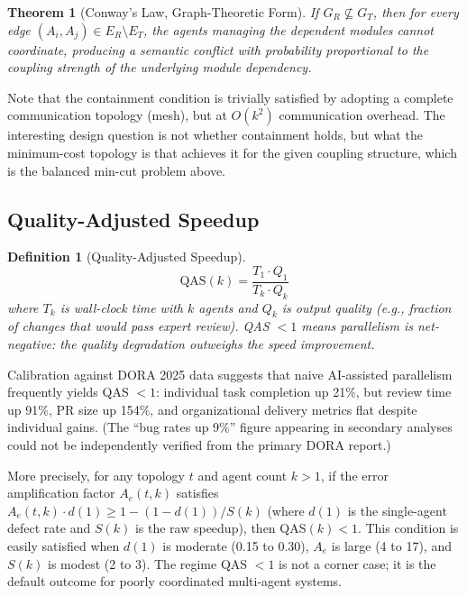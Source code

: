\documentclass[11pt, a4paper, logo, copyright]{googledeepmind}
\newtheorem{definition}{Definition}[section]
\newtheorem{theorem}{Theorem}[section]
\begin{document}
\begin{theorem}[Conway's Law, Graph-Theoretic Form]
\label{thm:conway}
If $G_R \not\subseteq G_T$, then for every edge $(A_i, A_j) \in E_R \setminus E_T$, the agents managing the dependent modules cannot coordinate, producing a semantic conflict with probability proportional to the coupling strength of the underlying module dependency.
\end{theorem}

Note that the containment condition is trivially satisfied by adopting a complete communication topology (mesh), but at $O(k^2)$ communication overhead. The interesting design question is not whether containment holds, but what the minimum-cost topology is that achieves it for the given coupling structure, which is the balanced min-cut problem above.

\subsection{Quality-Adjusted Speedup}

\begin{definition}[Quality-Adjusted Speedup]
\label{def:qas}
\begin{equation}
    \text{QAS}(k) = \frac{T_1 \cdot Q_1}{T_k \cdot Q_k}
\end{equation}
where $T_k$ is wall-clock time with $k$ agents and $Q_k$ is output quality (e.g., fraction of changes that would pass expert review). QAS $< 1$ means parallelism is net-negative: the quality degradation outweighs the speed improvement.
\end{definition}

Calibration against DORA 2025 data suggests that naive AI-assisted parallelism frequently yields QAS $< 1$: individual task completion up 21\%, but review time up 91\%, PR size up 154\%, and organizational delivery metrics flat despite individual gains. (The ``bug rates up 9\%'' figure appearing in secondary analyses could not be independently verified from the primary DORA report.)

More precisely, for any topology $t$ and agent count $k > 1$, if the error amplification factor $A_e(t,k)$ satisfies $A_e(t, k) \cdot d(1) \geq 1 - (1 - d(1))/S(k)$ (where $d(1)$ is the single-agent defect rate and $S(k)$ is the raw speedup), then QAS$(k) < 1$. This condition is easily satisfied when $d(1)$ is moderate (0.15 to 0.30), $A_e$ is large (4 to 17), and $S(k)$ is modest (2 to 3). The regime QAS $< 1$ is not a corner case; it is the default outcome for poorly coordinated multi-agent systems.
\end{document}
